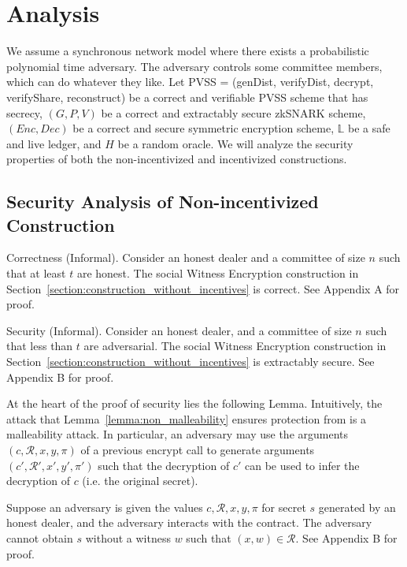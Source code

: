 \section{Analysis}
We assume a synchronous network model where there exists a probabilistic polynomial time adversary.
The adversary controls some committee members, which can do whatever they like.
Let \textsf{PVSS} = (\textsf{genDist}, \textsf{verifyDist}, \textsf{decrypt}, \textsf{verifyShare}, \textsf{reconstruct}) be a correct and verifiable PVSS scheme that has secrecy,
$(G, P, V)$ be a correct and extractably secure zkSNARK scheme, $(Enc, Dec)$ be a correct and secure symmetric encryption scheme,
$\mathbb{L}$ be a safe and live ledger, and $H$ be a random oracle.
We will analyze the security properties of both the non-incentivized and incentivized constructions.

\subsection{Security Analysis of Non-incentivized Construction}
\begin{theorem}{Correctness (Informal).}\label{thm:correctness_hm}
    Consider an honest dealer and a committee of size $n$ such that at least $t$ are honest.
    The social Witness Encryption construction in Section~\ref{section:construction_without_incentives} is correct.
    See Appendix A for proof.
\end{theorem}

\begin{theorem}{Security (Informal).}\label{thm:security_hm}
    Consider an honest dealer, and a committee of size $n$ such that less than $t$ are adversarial.
    The social Witness Encryption construction in Section~\ref{section:construction_without_incentives} is extractably secure.
    See Appendix B for proof.
\end{theorem}

At the heart of the proof of security lies the following Lemma.
Intuitively, the attack that Lemma~\ref{lemma:non_malleability} ensures protection from is a malleability attack.
In particular, an adversary may use the arguments $(c, \mathcal{R}, x, y, \pi)$ of a previous \textsf{encrypt} call to generate arguments $(c', \mathcal{R}', x', y', \pi')$ such that the decryption of $c'$ can be used to infer the decryption of $c$ (i.e. the original secret).

\begin{lemma}\label{lemma:non_malleability}
    Suppose an adversary is given the values $c, \mathcal{R}, x, y, \pi$ for secret $s$ generated by an honest dealer, and the adversary interacts with the contract.
    The adversary cannot obtain $s$ without a witness $w$ such that $(x, w) \in \mathcal{R}$. See Appendix B for proof.
\end{lemma}

